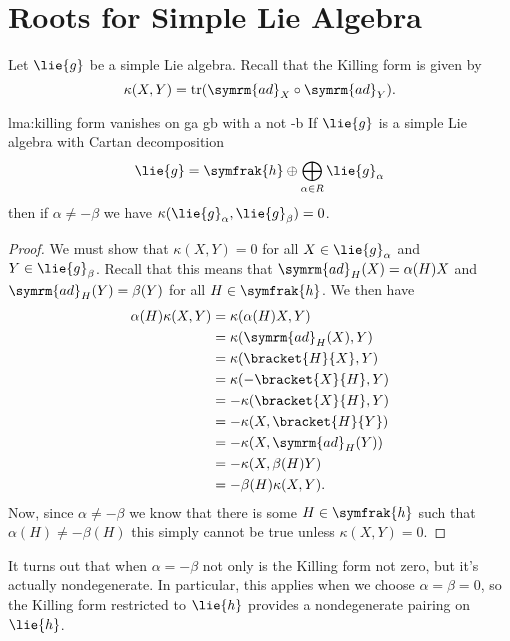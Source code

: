\documentclass[fleqn]{NotesClass}
\DeclareMathOperator{\tr}{tr}
\newcommand{\ad}{\symrm{ad}}
\newcommand{\csa}{\symfrak{h}}
\begin{document}
    \section{Roots for Simple Lie Algebra}
    Let \(\lie{g}\) be a simple Lie algebra.
    Recall that the Killing form is given by
    \begin{equation}
        \kappa(X, Y) = \tr(\ad_X \circ \ad_Y).
    \end{equation}
    
    \begin{lma}{}{lma:killing form vanishes on ga gb with a not -b}
        If \(\lie{g}\) is a simple Lie algebra with Cartan decomposition
        \begin{equation}
            \lie{g} = \csa \oplus \bigoplus_{\alpha \in R} \lie{g}_{\alpha}
        \end{equation}
        then if \(\alpha \ne -\beta\) we have \(\kappa(\lie{g}_\alpha, \lie{g}_\beta) = 0\).
        \begin{proof}
            We must show that \(\kappa(X, Y) = 0\) for all \(X \in \lie{g}_\alpha\) and \(Y \in \lie{g}_\beta\).
            Recall that this means that \(\ad_H(X) = \alpha(H)X\) and \(\ad_H(Y) = \beta(Y)\) for all \(H \in \csa\).
            We then have
            \begin{align}
                \alpha(H) \kappa(X, Y) &= \kappa(\alpha(H) X, Y)\\
                &= \kappa(\ad_H(X), Y)\\
                &= \kappa(\bracket{H}{X}, Y)\\
                &= \kappa(-\bracket{X}{H}, Y)\\
                &= -\kappa(\bracket{X}{H}, Y)\\
                &= -\kappa(X, \bracket{H}{Y})\\
                &= -\kappa(X, \ad_H(Y))\\
                &= -\kappa(X, \beta(H)Y)\\
                &= -\beta(H)\kappa(X, Y).
            \end{align}
            Now, since \(\alpha \ne -\beta\) we know that there is some \(H \in \csa\) such that \(\alpha(H) \ne -\beta(H)\) this simply cannot be true unless \(\kappa(X, Y) = 0\).
        \end{proof}
    \end{lma}
    
    It turns out that when \(\alpha = -\beta\) not only is the Killing form not zero, but it's actually nondegenerate.
    In particular, this applies when we choose \(\alpha = \beta = 0\), so the Killing form restricted to \(\lie{h}\) provides a nondegenerate pairing on \(\lie{h}\).
    
\end{document}
